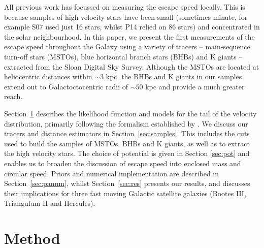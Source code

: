 \documentclass[useAMS,twocolumn,usenatbib]{mn2e}
\begin{document}
All previous work has focussed on measuring the escape speed
locally. This is because samples of high velocity stars have been
small (sometimes minute, for example S07 used just 16 stars, whilst
P14 relied on 86 stars) and concentrated in the solar neighbourhood.
In this paper, we present the first measurements of the escape speed
throughout the Galaxy using a variety of tracers -- main-sequence
turn-off stars (MSTOs), blue horizontal branch stars (BHBs) and K
giants -- extracted from the Sloan Digital Sky Survey. Although the
MSTOs are located at heliocentric distances within $\sim 3$ kpc, the
BHBs and K giants in our samples extend out to Galactoctocentric radii
of $\sim 50$ kpc and provide a much greater reach.

Section~\ref{sec:method} describes the likelihood function and models
for the tail of the velocity distribution, primarily following the
formalism established by \citet{Le90}. We discuss our tracers and
distance estimators in Section~\ref{sec:samples}. This includes the
cuts used to build the samples of MSTOs, BHBs and K giants, as well as
to extract the high velocity stars. The choice of potential is given
in Section \ref{sec:pot} and enables us to broaden the discussion of
escape speed into enclosed mass and circular speed. Priors and
numerical implementation are described in Section~\ref{sec:pannm},
whilst Section~\ref{sec:res} presents our results, and discusses their
implications for three fast moving Galactic satellite galaxies (Bootes
III, Triangulum II and Hercules).

\section{Method}

\label{sec:method}

\end{document}
